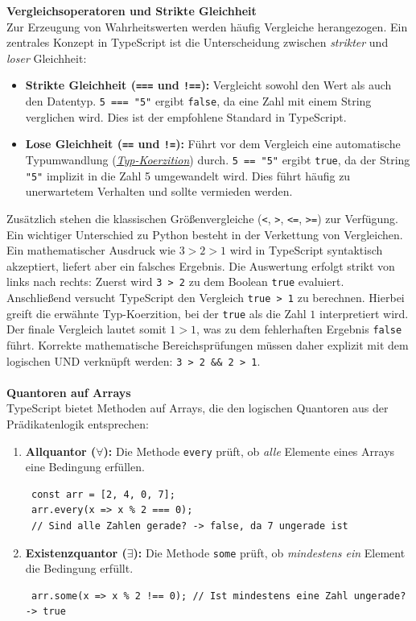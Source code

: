\textbf{Vergleichsoperatoren und Strikte Gleichheit}\\
Zur Erzeugung von Wahrheitswerten werden häufig Vergleiche herangezogen. Ein zentrales Konzept in TypeScript ist die Unterscheidung zwischen \textit{strikter} und \textit{loser} Gleichheit:
\begin{itemize}
	\item \textbf{Strikte Gleichheit (\texttt{===} und \texttt{!==}):} Vergleicht sowohl den Wert als auch den Datentyp. \texttt{5 === "5"} ergibt \texttt{false}, da eine Zahl mit einem String verglichen wird. Dies ist der empfohlene Standard in TypeScript.
	\item \textbf{Lose Gleichheit (\texttt{==} und \texttt{!=}):} Führt vor dem Vergleich eine automatische Typumwandlung (\textit{\href{https://developer.mozilla.org/en-US/docs/Glossary/Type_coercion}{Typ-Koerzition}}) durch. \texttt{5 == "5"} ergibt \texttt{true}, da der String \texttt{"5"} implizit in die Zahl 5 umgewandelt wird. Dies führt häufig zu unerwartetem Verhalten und sollte vermieden werden.
\end{itemize}
Zusätzlich stehen die klassischen Größenvergleiche (\texttt{<}, \texttt{>}, \texttt{<=}, \texttt{>=}) zur Verfügung.\\
Ein wichtiger Unterschied zu Python besteht in der Verkettung von Vergleichen. Ein mathematischer Ausdruck wie $3 > 2 > 1$ wird in TypeScript syntaktisch akzeptiert, liefert aber ein falsches Ergebnis. Die Auswertung erfolgt strikt von links nach rechts: Zuerst wird \texttt{3 > 2} zu dem Boolean \texttt{true} evaluiert. Anschließend versucht TypeScript den Vergleich \texttt{true > 1} zu berechnen. Hierbei greift die erwähnte Typ-Koerzition, bei der \texttt{true} als die Zahl $1$ interpretiert wird. Der finale Vergleich lautet somit $1 > 1$, was zu dem fehlerhaften Ergebnis \texttt{false} führt. Korrekte mathematische Bereichsprüfungen müssen daher explizit mit dem logischen UND verknüpft werden: \texttt{3 > 2 \&\& 2 > 1}.\\\\
\textbf{Quantoren auf Arrays}\\
TypeScript bietet Methoden auf Arrays, die den logischen Quantoren aus der Prädikatenlogik entsprechen:
\begin{enumerate}
	\item \textbf{Allquantor ($\forall$):} Die Methode \texttt{every} prüft, ob \textit{alle} Elemente eines Arrays eine Bedingung erfüllen.
\begin{verbatim}
 const arr = [2, 4, 0, 7];
 arr.every(x => x % 2 === 0); 
 // Sind alle Zahlen gerade? -> false, da 7 ungerade ist
\end{verbatim}
	
	\item \textbf{Existenzquantor ($\exists$):} Die Methode \texttt{some} prüft, ob \textit{mindestens ein} Element die Bedingung erfüllt.
\begin{verbatim}
 arr.some(x => x % 2 !== 0); // Ist mindestens eine Zahl ungerade? -> true
\end{verbatim}
	
\end{enumerate}
